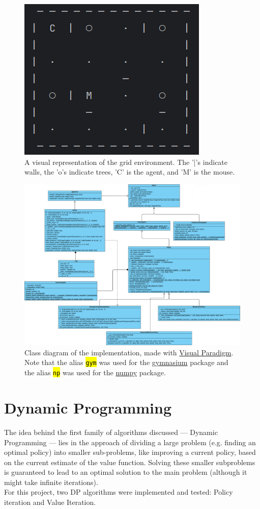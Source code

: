 \documentclass{class}
\def\code#1{\hl{\texttt{#1}}}
\begin{document}
\begin{figure}[H]
    \centering
    \includegraphics[width=0.5\linewidth]{images/environment.png}
    \caption{A visual representation of the grid environment. The '|'s indicate walls, the 'o's indicate trees, 'C' is the agent, and 'M' is the mouse.}
    \label{fig:environment}
\end{figure}

\begin{figure}
    \centering
    \includegraphics[width=0.99\linewidth]{../plots/rl_project_uml.png}
    \caption{Class diagram of the implementation, made with \href{https://online.visual-paradigm.com/}{Visual Paradigm}. Note that the alias \code{gym} was used for the \href{https://gymnasium.farama.org/}{gymnasium} package and the alias \code{np} was used for the \href{https://numpy.org/doc/2.1/index.html}{numpy} package.}
    \label{fig: class diagram}
\end{figure}

\section{Dynamic Programming}
\label{sec: dynamic programming}
The idea behind the first family of algorithms discussed --- Dynamic Programming --- lies in the approach of dividing a large problem (e.g. finding an optimal policy) into smaller sub-problems, like improving a current policy, based on the current estimate of the value function. Solving these smaller subproblems is guaranteed to lead to an optimal solution to the main problem (although it might take infinite iterations).
\\[0.3cm]
For this project, two DP algorithms were implemented and tested: Policy iteration and Value Iteration.
\end{document}
